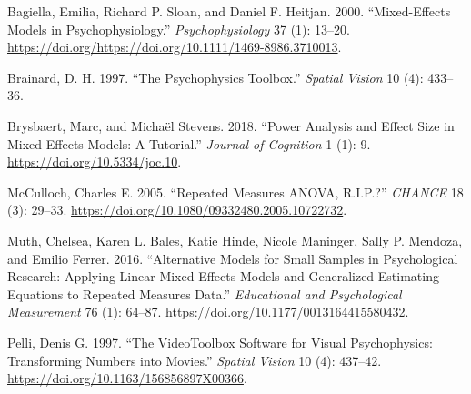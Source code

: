 \documentclass{article}
\newlength{\cslhangindent}
\newenvironment{cslreferences}%
  {\setlength{\parindent}{0pt}%
  \everypar{\setlength{\hangindent}{\cslhangindent}}\ignorespaces}%
  {\par}
\begin{document}
\hypertarget{refs}{}
\begin{cslreferences}
\leavevmode\hypertarget{ref-bagiellaMixedeffectsModelsPsychophysiology2000}{}%
Bagiella, Emilia, Richard P. Sloan, and Daniel F. Heitjan. 2000.
``Mixed-Effects Models in Psychophysiology.'' \emph{Psychophysiology} 37
(1): 13--20.
\url{https://doi.org/https://doi.org/10.1111/1469-8986.3710013}.

\leavevmode\hypertarget{ref-brainardPsychophysicsToolbox1997}{}%
Brainard, D. H. 1997. ``The Psychophysics Toolbox.'' \emph{Spatial
Vision} 10 (4): 433--36.

\leavevmode\hypertarget{ref-brysbaertPowerAnalysisEffect2018}{}%
Brysbaert, Marc, and Michaël Stevens. 2018. ``Power Analysis and Effect
Size in Mixed Effects Models: A Tutorial.'' \emph{Journal of Cognition}
1 (1): 9. \url{https://doi.org/10.5334/joc.10}.

\leavevmode\hypertarget{ref-mccullochRepeatedMeasuresANOVA2005}{}%
McCulloch, Charles E. 2005. ``Repeated Measures ANOVA, R.I.P.?''
\emph{CHANCE} 18 (3): 29--33.
\url{https://doi.org/10.1080/09332480.2005.10722732}.

\leavevmode\hypertarget{ref-muthAlternativeModelsSmall2016}{}%
Muth, Chelsea, Karen L. Bales, Katie Hinde, Nicole Maninger, Sally P.
Mendoza, and Emilio Ferrer. 2016. ``Alternative Models for Small Samples
in Psychological Research: Applying Linear Mixed Effects Models and
Generalized Estimating Equations to Repeated Measures Data.''
\emph{Educational and Psychological Measurement} 76 (1): 64--87.
\url{https://doi.org/10.1177/0013164415580432}.

\leavevmode\hypertarget{ref-pelliVideoToolboxSoftwareVisual1997}{}%
Pelli, Denis G. 1997. ``The VideoToolbox Software for Visual
Psychophysics: Transforming Numbers into Movies.'' \emph{Spatial Vision}
10 (4): 437--42. \url{https://doi.org/10.1163/156856897X00366}.
\end{cslreferences}



\end{document}
